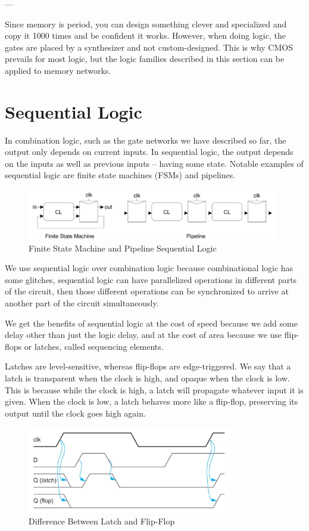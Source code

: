 \documentclass{article}
\begin{document}
---

Since memory is period, you can design something clever and specialized and copy it 1000 times and be confident it works. However, when doing logic, the gates are placed by a synthesizer and not custom-designed. This is why CMOS prevails for most logic, but the logic families described in this section can be applied to memory networks.  

\section{Sequential Logic}

In combination logic, such as the gate networks we have described so far, the output only depends on current inputs. In sequential logic, the output depends on the inputs as well as previous inputs -- having some state. Notable examples of sequential logic are finite state machines (FSMs) and pipelines.

\begin{figure}[ht!]
\centering
\includegraphics[width=110mm]{seq.png}
\caption{Finite State Machine and Pipeline Sequential Logic}
\end{figure}

We use sequential logic over combination logic because combinational logic has some glitches, sequential logic can have parallelized operations in different parts of the circuit, then those different operations can be synchronized to arrive at another part of the circuit simultaneously.

We get the benefits of sequential logic at the cost of speed because we add some delay other than just the logic delay, and at the cost of area because we use flip-flops or latches, called sequencing elements.

Latches are level-sensitive, whereas flip-flops are edge-triggered. We say that a latch is transparent when the clock is high, and opaque when the clock is low. This is because while the clock is high, a latch will propagate whatever input it is given. When the clock is low, a latch behaves more like a flip-flop, preserving its output until the clock goes high again. 


\begin{figure}[ht!]
\centering
\includegraphics[width=90mm]{latchff.png}
\caption{Difference Between Latch and Flip-Flop}
\end{figure}
\end{document}
